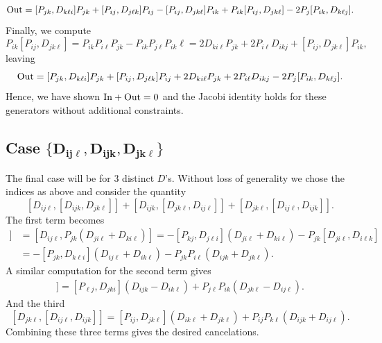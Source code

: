 \documentclass[pdftex]{sigma}
\numberwithin{equation}{section}
\begin{document}
   \begin{gather*}
   {\rm Out}=[ P_{jk}, D_{k\ell i}] P_{jk}+[P_{ij}, D_{j\ell k}]P_{ij}
 -[ P_{ij}, D_{jk\ell}]P_{ik}+ P_{ik}[ P_{ij}, D_{jk\ell}] -2P_j [ P_{ik}, D_{k\ell j}].
 \end{gather*}
    Finally, we compute
    \[
    P_{ik}[ P_{ij}, D_{jk\ell}] =P_{ik} P_{i\ell} P_{jk}- P_{ik}P_{j\ell}P_{ik}\ell= 2D_{ki\ell}P_{jk}+2P_{i\ell} D_{ikj} + [ P_{ij}, D_{jk\ell}] P_{ik},
    \]
    leaving
   \[
 {\rm Out}= [ P_{jk}, D_{k\ell i}] P_{jk}+[P_{ij}, D_{j\ell k}]P_{ij} +2D_{ki\ell}P_{jk}+2P_{i\ell} D_{ikj} -2P_j [ P_{ik}, D_{k\ell j}].
   \]
  Hence, we have shown ${\rm In} +{\rm Out} =0$ and the Jacobi identity holds for these generators without additional constraints.

 \subsection[Case \{ D\_ijl, D\_ijk, D\_jkl\}]{Case $\boldsymbol{\{ D_{ij\ell}, D_{ijk}, D_{jk\ell}\}}$}
 The final case will be for 3 distinct $D$'s. Without loss of generality we chose the indices as above and consider the quantity
 \[
  [ D_{ij\ell}, [D_{ijk}, D_{jk\ell}]] + [D_{ijk},[D_{jk\ell}, D_{ij\ell}]] +[D_{jk\ell}, [D_{ij\ell},D_{ijk}]].
  \]
 The first term becomes
 \begin{align*}
    [ D_{ij\ell}, [D_{ijk}, D_{jk\ell}]]&=  [ D_{ij\ell}, P_{jk}(D_{ji\ell}+D_{ki\ell})]
    = -[P_{kj},D_{j\ell i}] (D_{ji\ell}+D_{ki\ell})
-P_{jk}[D_{ji\ell}, D_{i\ell k} ]\\
&=  -[P_{jk}, D_{k\ell i}](D_{ij\ell}+D_{ik\ell}) -P_{jk}P_{i\ell}(D_{ijk}+D_{jk\ell}).
 \end{align*}
 A similar computation for the second term gives
 \begin{eqnarray*}
   [D_{ijk},[D_{jk\ell}, D_{ij\ell}]]=[P_{\ell j}, D_{jki}](D_{ijk}-D_{ik\ell})+P_{j\ell}P_{ik}(D_{jk\ell}-D_{ij\ell}). \end{eqnarray*}
And the third
\[ [D_{jk\ell}, [D_{ij\ell},D_{ijk}]] =[P_{ij}, D_{jk\ell}](D_{ik\ell}+D_{jk\ell})+P_{ij}P_{k\ell}(D_{ijk}+D_{ij\ell}).\]
   Combining these three terms gives the desired cancelations.
\end{document}

